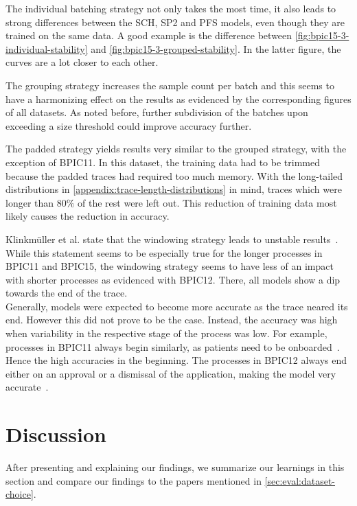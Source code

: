 The individual batching strategy not only takes the most time, it also leads to strong differences between the SCH, SP2 and PFS models, even though they are trained on the same data. A good example is the difference between \autoref{fig:bpic15-3-individual-stability} and \autoref{fig:bpic15-3-grouped-stability}. In the latter figure, the curves are a lot closer to each other.

The grouping strategy increases the sample count per batch and this seems to have a harmonizing effect on the results as evidenced by the corresponding figures of all datasets. As noted before, further subdivision of the batches upon exceeding a size threshold could improve accuracy further.

The padded strategy yields results very similar to the grouped strategy, with the exception of BPIC11. In this dataset, the training data had to be trimmed because the padded traces had required too much memory. With the long-tailed distributions in \autoref{appendix:trace-length-distributions} in mind, traces which were longer than $80\%$ of the rest were left out. This reduction of training data most likely causes the reduction in accuracy.

Klinkmüller et al. state that the windowing strategy leads to unstable results~\cite{klinkmuller2018reliablemonitoring}. While this statement seems to be especially true for the longer processes in BPIC11 and BPIC15, the windowing strategy seems to have less of an impact with shorter processes as evidenced with BPIC12. There, all models show a dip towards the end of the trace.\\

Generally, models were expected to become more accurate as the trace neared its end. However this did not prove to be the case. Instead, the accuracy was high when variability in the respective stage of the process was low. For example, processes in BPIC11 always begin similarly, as patients need to be onboarded~\cite{bose2011analysis}. Hence the high accuracies in the beginning. The processes in BPIC12 always end either on an approval or a dismissal of the application, making the model very accurate~\cite{adriansyah2012mining}.

\section{Discussion}
\label{sec:eval:discussion}
After presenting and explaining our findings, we summarize our learnings in this section and compare our findings to the papers mentioned in \autoref{sec:eval:dataset-choice}.\\

